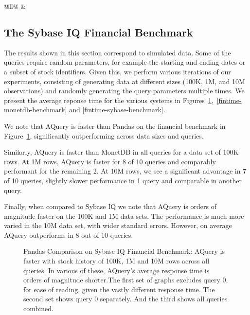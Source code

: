 \documentclass{acm_proc_article-sp}
\begin{document}
\begin{table}[]
{\begin{tabular}{@{}ll@{}}
 &                                                                                                                                                                        \\ \bottomrule
\end{tabular}
}
\caption{Financial Queries Description}
\label{fintime-description}
\end{table}


\subsection{The Sybase IQ Financial Benchmark}
The results shown in this section correspond to simulated data. Some of the queries require
random parameters, for example the starting and ending dates or a subset of stock identifiers. Given this, we perform
various iterations of our experiments, consisting of generating data at different sizes (100K, 1M, and 10M observations) and randomly generating the query parameters multiple times. We present the average reponse time for the
various systems in Figures~\ref{fintime-pandas-benchmark},~\ref{fintime-monetdb-benchmark} and \ref{fintime-sybase-benchmark}.

We note that AQuery is faster than Pandas on the financial benchmark in Figure~\ref{fintime-pandas-benchmark}, significantly outperforming across data sizes and queries. 

Similarly, AQuery is faster than MonetDB in all queries for a data set of 100K rows. At 1M rows, AQuery is faster for 8 of 10 queries and comparably performant for the remaining 2. At 10M rows, we see a significant advantage
in 7 of 10 queries, slightly slower performance in 1 query and comparable in another query.

Finally, when compared to Sybase IQ we note that AQuery is orders of magnitude faster on the 100K
and 1M data sets. The performance is much more varied in  the 10M data set, with wider standard errors. However, on average AQuery outperforms in 8 out of 10 queries.


\begin{figure}
\caption{Pandas Comparison on Sybase IQ Financial Benchmark: AQuery is faster with stock history of
100K, 1M and 10M rows across all queries. In various of these, AQuery's average response time is orders of magnitude shorter.The first set of graphs excludes query 0, for ease of reading, given the vastly different response time. The second set shows query 0 separately. And the third shows all queries combined.}
\label{fintime-pandas-benchmark}
\end{figure}
\end{document}

